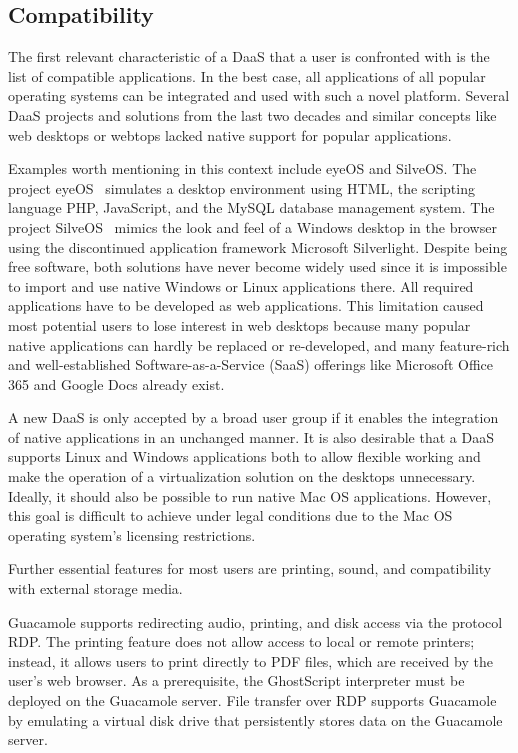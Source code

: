 \documentclass[runningheads]{llncs}
\begin{document}
\subsection{Compatibility}
% 

The first relevant characteristic of a DaaS that a user is confronted with is the list of compatible applications. In the best case, all applications of all popular operating systems can be integrated and used with such a novel platform. Several DaaS projects and solutions from the last two decades and similar concepts like web desktops or webtops lacked native support for popular applications.

Examples worth mentioning in this context include eyeOS and SilveOS. The project eyeOS~\cite{liu2012research,vidyabanu2011implementation} simulates a desktop environment using HTML, the scripting language PHP, JavaScript, and the MySQL database management system. The project SilveOS~\cite{garmpis2016design} mimics the look and feel of a Windows desktop in the browser using the discontinued application framework Microsoft Silverlight. Despite being free software, both solutions have never become widely used since it is impossible to import and use native Windows or Linux applications there. All required applications have to be developed as web applications. This limitation caused most potential users to lose interest in web desktops because many popular native applications can hardly be replaced or re-developed, and many feature-rich and well-established Software-as-a-Service (SaaS) offerings like Microsoft Office 365 and Google Docs already exist.

A new DaaS is only accepted by a broad user group if it enables the integration of native applications in an unchanged manner. It is also desirable that a DaaS supports Linux and Windows applications both to allow flexible working and make the operation of a virtualization solution on the desktops unnecessary. Ideally, it should also be possible to run native Mac OS applications. However, this goal is difficult to achieve under legal conditions due to the Mac OS operating system's licensing restrictions.

Further essential features for most users are printing, sound, and compatibility with external storage media.

Guacamole supports redirecting audio, printing, and disk access via the protocol RDP. The printing feature does not allow access to local or remote printers; instead, it allows users to print directly to PDF files, which are received by the user's web browser. As a prerequisite, the GhostScript interpreter must be deployed on the Guacamole server. File transfer over RDP supports Guacamole by emulating a virtual disk drive that persistently stores data on the Guacamole server.~\cite{ApacheGuacamole2024}
\end{document}
